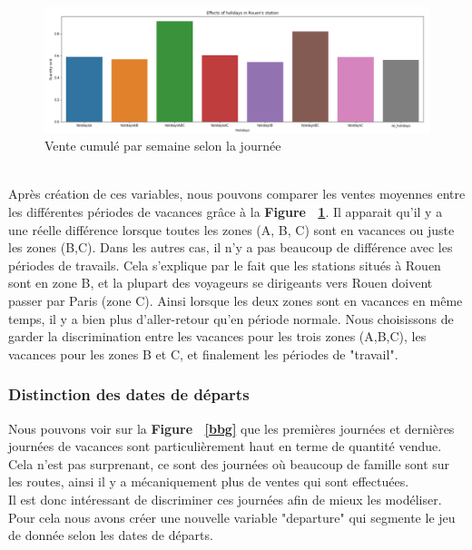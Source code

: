 \documentclass{article} %
\begin{document}
\begin{figure}[!h]
	\centering
	\includegraphics[keepaspectratio = true,scale=0.65]{saleholiday.png}
	\caption{Vente cumulé par semaine selon la journée}
	\label{fig:salehol}
\end{figure}
~\\
Après création de ces variables, nous pouvons comparer les ventes moyennes entre les différentes périodes de vacances grâce à la \textbf{Figure ~\ref{fig:salehol}}. Il apparait qu'il y a une réelle différence lorsque toutes les zones (A, B, C) sont en vacances ou juste les zones (B,C). Dans les autres cas, il n'y a pas beaucoup de différence avec les périodes de travails. Cela s'explique par le fait que les stations situés à Rouen sont en zone B, et la plupart des voyageurs se dirigeants vers Rouen doivent passer par Paris (zone C). Ainsi lorsque les deux zones sont en vacances en même temps, il y a bien plus d'aller-retour qu'en période normale. Nous choisissons de garder la discrimination entre les vacances pour les trois zones (A,B,C), les vacances pour les zones B et C, et finalement les périodes de "travail".
\subsubsection{Distinction des dates de départs}
Nous pouvons voir sur la \textbf{Figure ~\ref{bbg}} que les premières journées et dernières journées de vacances sont particulièrement haut en terme de quantité vendue. Cela n'est pas surprenant, ce sont des journées où beaucoup de famille sont sur les routes, ainsi il y a mécaniquement plus de ventes qui sont effectuées.\\
Il est donc intéressant de discriminer ces journées afin de mieux les modéliser. Pour cela nous avons créer une nouvelle variable "departure"  qui segmente le jeu de donnée selon les dates de départs.
\end{document}
